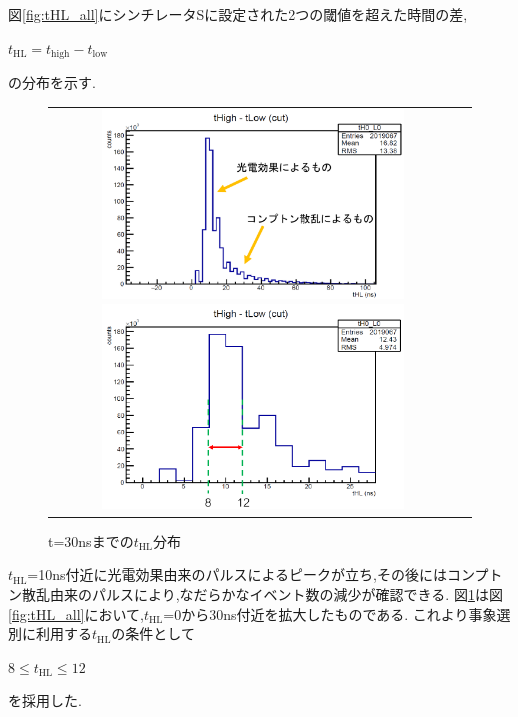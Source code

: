 図\ref{fig:tHL_all}にシンチレータSに設定された2つの閾値を超えた時間の差,
\begin{center}
	$t_\textrm{HL}=t_\textrm{high}-t_\textrm{low}$
\end{center}
の分布を示す.
\begin{figure}[htbp]
	\begin{tabular}{cc}
		\begin{minipage}{0.5\hsize}
			\centering
				\includegraphics[width=80mm]{fig/isb/tHL.pdf}
				\caption{$t_\textrm{HL}$の分布}
				\label{fig:tHL_all}
		\end{minipage}
		\begin{minipage}{0.5\hsize}
			\centering
				\includegraphics[width=80mm]{fig/isb/tHL_cut.pdf}
				\caption{t=30nsまでの$t_\textrm{HL}$分布}
				\label{fig:tHL_zoom}
		\end{minipage}
	\end{tabular}
\end{figure}

$t_\textrm{HL}$=10ns付近に光電効果由来のパルスによるピークが立ち,その後にはコンプトン散乱由来のパルスにより,なだらかなイベント数の減少が確認できる.
図\ref{fig:tHL_zoom}は図\ref{fig:tHL_all}において,$t_\textrm{HL}$=0から30ns付近を拡大したものである.
これより事象選別に利用する$t_\textrm{HL}$の条件として
\begin{center}
	$8\leq$$t_\textrm{HL}$$\leq12$
\end{center}
を採用した.
